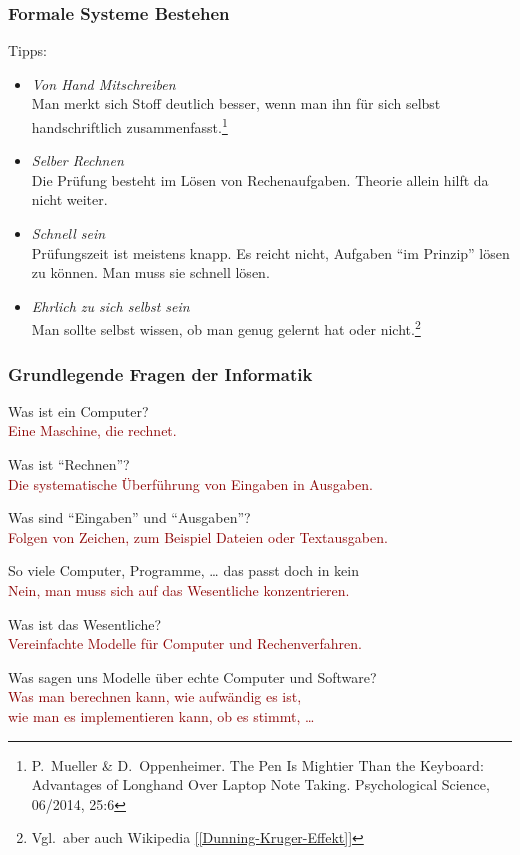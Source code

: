 \documentclass[aspectratio=1610,onlymath]{beamer}
\begin{document}
\begin{frame}\frametitle{Formale Systeme Bestehen}
Tipps:
\begin{itemize}
\item \emph{Von Hand Mitschreiben}\\
	{\footnotesize Man merkt sich Stoff deutlich besser, wenn man ihn für sich selbst handschriftlich
	zusammenfasst.\footnote{\tiny P.\ Mueller \& D.\ Oppenheimer. The Pen Is Mightier Than the Keyboard: Advantages of Longhand Over Laptop Note Taking. Psychological Science, 06/2014, 25:6}}
\item \emph{Selber Rechnen}\\
	{\footnotesize Die Prüfung besteht im Lösen von Rechenaufgaben. Theorie allein hilft da nicht weiter.}
\item \emph{Schnell sein}\\
	{\footnotesize Prüfungszeit ist meistens knapp. Es reicht nicht, Aufgaben "`im Prinzip"' lösen zu können. Man muss sie schnell lösen.}
\item \emph{Ehrlich zu sich selbst sein}\\
	{\footnotesize Man sollte selbst wissen, ob man genug gelernt hat oder nicht.\footnote{\tiny Vgl.\ aber auch Wikipedia \href{https://de.wikipedia.org/wiki/Dunning-Kruger-Effekt}{[[Dunning-Kruger-Effekt]]}}}
\end{itemize}

\end{frame}



\newcommand{\qaline}[2]{\alert{#1}\\\hfill\pause \textcolor{darkred}{#2}\\[1.5ex]}

\begin{frame}\frametitle{Grundlegende Fragen der Informatik}

\qaline{Was ist ein Computer?}{Eine Maschine, die rechnet.}\pause

\qaline{Was ist "`Rechnen"'?}{Die systematische Überführung von Eingaben in Ausgaben.}\pause

\qaline{Was sind "`Eingaben"' und "`Ausgaben"'?}{Folgen von Zeichen, zum Beispiel Dateien oder Textausgaben.}\pause

\qaline{So viele Computer, Programme, \ldots{} das passt doch in kein \ghost{Studium!}}{Nein, man muss sich auf das Wesentliche konzentrieren.}\pause

\qaline{Was ist das Wesentliche?}{Vereinfachte Modelle für Computer und Rechenverfahren.}\pause

\qaline{Was sagen uns Modelle über echte Computer und Software?}{Was man berechnen kann, wie aufwändig es ist,\\\hfill wie man es implementieren kann, ob es stimmt, \ldots}

\end{frame}
\end{document}
